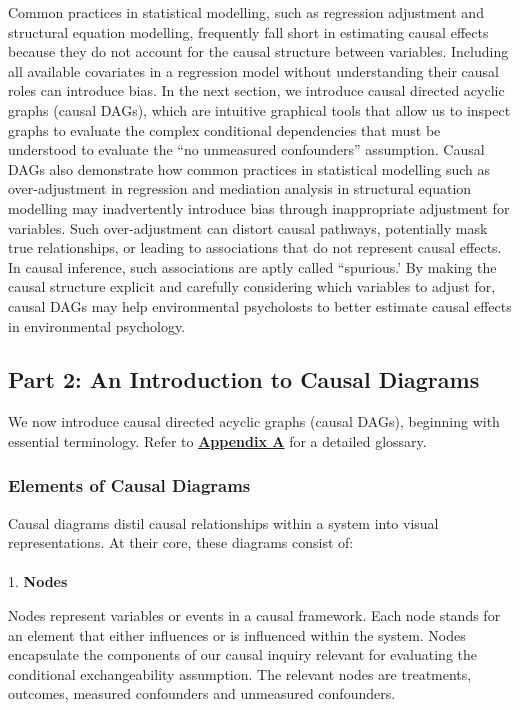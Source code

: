 \documentclass[
  singlecolumn]{article}
\makeatletter
\let\oldparagraph\paragraph
\renewcommand{\paragraph}{
    \@ifstar
      \xxxParagraphStar
      \xxxParagraphNoStar
  }
\newcommand{\xxxParagraphStar}[1]{\oldparagraph*{#1}\mbox{}}
\newcommand{\xxxParagraphNoStar}[1]{\oldparagraph{#1}\mbox{}}
\makeatother
\begin{document}
Common practices in statistical modelling, such as regression adjustment
and structural equation modelling, frequently fall short in estimating
causal effects because they do not account for the causal structure
between variables. Including all available covariates in a regression
model without understanding their causal roles can introduce bias. In
the next section, we introduce causal directed acyclic graphs (causal
DAGs), which are intuitive graphical tools that allow us to inspect
graphs to evaluate the complex conditional dependencies that must be
understood to evaluate the ``no unmeasured confounders'' assumption.
Causal DAGs also demonstrate how common practices in statistical
modelling such as over-adjustment in regression and mediation analysis
in structural equation modelling may inadvertently introduce bias
through inappropriate adjustment for variables. Such over-adjustment can
distort causal pathways, potentially mask true relationships, or leading
to associations that do not represent causal effects. In causal
inference, such associations are aptly called ``spurious.' By making the
causal structure explicit and carefully considering which variables to
adjust for, causal DAGs may help environmental psycholosts to better
estimate causal effects in environmental psychology.

\subsection{Part 2: An Introduction to Causal
Diagrams}\label{section-part2}

We now introduce causal directed acyclic graphs (causal DAGs), beginning
with essential terminology. Refer to
\hyperref[appendix-a]{\textbf{Appendix A}} for a detailed glossary.

\subsubsection{Elements of Causal
Diagrams}\label{elements-of-causal-diagrams}

Causal diagrams distil causal relationships within a system into visual
representations. At their core, these diagrams consist of:

\paragraph{\texorpdfstring{1. \textbf{Nodes}}{1. Nodes}}\label{nodes}

Nodes represent variables or events in a causal framework. Each node
stands for an element that either influences or is influenced within the
system. Nodes encapsulate the components of our causal inquiry relevant
for evaluating the conditional exchangeability assumption. The relevant
nodes are treatments, outcomes, measured confounders and unmeasured
confounders.
\end{document}
